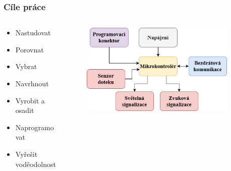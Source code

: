 \documentclass[%
  12pt,       				%
	t,                  %
	aspectratio=1610,   %
	unicode,						%
]{beamer}				    	%
\begin{document}
\begin{frame} 
	\frametitle{Cíle práce}

	\begin{columns}[T] 								%
		\begin{column}{0.25\textwidth}		%
			\begin{itemize}
				\item Nastudovat
				\item Porovnat
				\item Vybrat
				\item Navrhnout 
				\item Vyrobit a osadit 
				\item Naprogramovat
				\item Vyřešit voděodolnost
		\end{itemize}
		\end{column}
		\begin{column}{0.65\textwidth}		%
			\begin{figure}%
				\centering
				\vspace{0.4cm}	              %
				\includegraphics[width=1\columnwidth]{obrazky/zakladni_blokove_schema_prezentace.jpg}
			\end{figure}
		\end{column}
		\begin{column}{0.1\textwidth}		%
		\end{column}
	\end{columns}	
		
	\end{frame}
\end{document}
